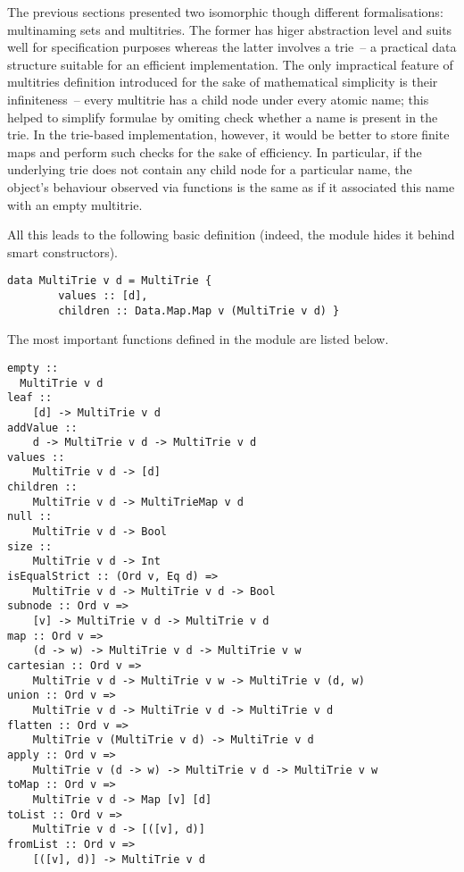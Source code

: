 \documentclass{article}
\theoremstyle{definition}
\begin{document}
The previous sections presented two isomorphic though different formalisations:
multinaming sets and multitries. The former has higer abstraction level and suits well
for specification purposes whereas the latter involves a trie~-- a practical
data structure suitable for an efficient implementation. The only impractical
feature of multitries definition introduced for the sake of mathematical
simplicity is their infiniteness~-- every multitrie has a child node under
every atomic name; this helped to simplify formulae by omiting check whether a
name is present in the trie.  In the trie-based implementation, however, it would be
better to store finite maps and perform such checks for the sake of efficiency.
In particular, if the underlying trie does not contain any child node for a
particular name, the object's behaviour observed via functions is the same as if
it associated this name with an empty multitrie.

All this leads to the following basic definition (indeed, the module hides it
behind smart constructors).

\begin{lstlisting}
data MultiTrie v d = MultiTrie {
        values :: [d],
        children :: Data.Map.Map v (MultiTrie v d) }
\end{lstlisting}

The most important functions defined in the module are listed below.

\begin{lstlisting}
empty ::
  MultiTrie v d
leaf ::
    [d] -> MultiTrie v d
addValue ::
    d -> MultiTrie v d -> MultiTrie v d
values ::
    MultiTrie v d -> [d]
children ::
    MultiTrie v d -> MultiTrieMap v d
null ::
    MultiTrie v d -> Bool
size ::
    MultiTrie v d -> Int
isEqualStrict :: (Ord v, Eq d) =>
    MultiTrie v d -> MultiTrie v d -> Bool
subnode :: Ord v =>
    [v] -> MultiTrie v d -> MultiTrie v d
map :: Ord v =>
    (d -> w) -> MultiTrie v d -> MultiTrie v w
cartesian :: Ord v =>
    MultiTrie v d -> MultiTrie v w -> MultiTrie v (d, w)
union :: Ord v =>
    MultiTrie v d -> MultiTrie v d -> MultiTrie v d
flatten :: Ord v =>
    MultiTrie v (MultiTrie v d) -> MultiTrie v d
apply :: Ord v =>
    MultiTrie v (d -> w) -> MultiTrie v d -> MultiTrie v w
toMap :: Ord v =>
    MultiTrie v d -> Map [v] [d]
toList :: Ord v =>
    MultiTrie v d -> [([v], d)]
fromList :: Ord v =>
    [([v], d)] -> MultiTrie v d
\end{lstlisting}
\end{document}
